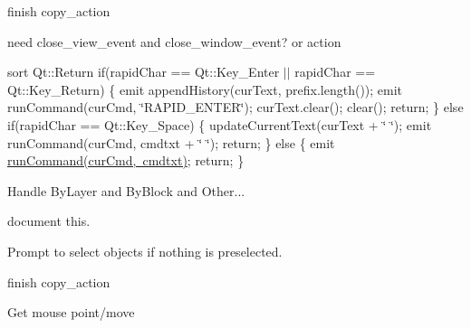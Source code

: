 \begin{DoxyRefList}
%
finish copy\+\_\+action  
\item[Member \mbox{\hyperlink{imgui__main_8c_a46c4ffe394ae864ae88bdba585993c38}{close\+\_\+event}} (int $\ast$event)]\label{todo__todo000019}%
%
need close\+\_\+view\+\_\+event and close\+\_\+window\+\_\+event? or action  
\item[Member \mbox{\hyperlink{class_cmd_prompt_input_ab44f78b31931ea15fb5729c6491512ed}{Cmd\+Prompt\+Input\+::process\+Input}} (const QChar \&rapid\+Char=QChar())]\label{todo__todo000001}%
%
sort Qt\+::\+Return if(rapid\+Char == Qt\+::\+Key\+\_\+\+Enter $\vert$$\vert$ rapid\+Char == Qt\+::\+Key\+\_\+\+Return) \{ emit append\+History(cur\+Text, prefix.\+length()); emit run\+Command(cur\+Cmd, \char`\"{}\+RAPID\+\_\+\+ENTER\char`\"{}); cur\+Text.\+clear(); clear(); return; \} else if(rapid\+Char == Qt\+::\+Key\+\_\+\+Space) \{ update\+Current\+Text(cur\+Text + \char`\"{} \char`\"{}); emit run\+Command(cur\+Cmd, cmdtxt + \char`\"{} \char`\"{}); return; \} else \{ emit \mbox{\hyperlink{class_cmd_prompt_input_aa506049eb78e7b035aa76af84f4ffcef}{run\+Command(cur\+Cmd, cmdtxt)}}; return; \}  
\item[Member \mbox{\hyperlink{imgui__main_8c_a152aab1306f180696e3304162009b6f7}{color\+Selector\+Index\+Changed}} (int index)]\label{todo__todo000174}%
%
Handle By\+Layer and By\+Block and Other...  
\item[Member \mbox{\hyperlink{imgui__main_8c_a2627a7999cd23d611de62da7205c82c0}{context\+\_\+menu\+\_\+event}} (void)]\label{todo__todo000050}%
%
document this.  
\item[Member \mbox{\hyperlink{imgui__main_8c_af07789864af2722ae9651aa41209d4ee}{copy}} (void)]\label{todo__todo000055}%
%
Prompt to select objects if nothing is preselected.  
\item[Member \mbox{\hyperlink{imgui__main_8c_ac2c076c4fbd19adc76e5400806450cee}{copy\+\_\+action}} (void)]\label{todo__todo000107}%
%
finish copy\+\_\+action  
\item[Member \mbox{\hyperlink{imgui__main_8c_aad92db755b8d2d546ba1a91ea4f01cad}{copy\+\_\+selected}} (void)]\label{todo__todo000157}%
%
Get mouse point/move  
\item[Member \mbox{\hyperlink{main_8c_a5d7bf5f964ae87921bab916b871ea2dd}{copy\+\_\+trim}} (char const $\ast$s)]\label{todo__todo000414}%
$$
\end{DoxyRefList}
